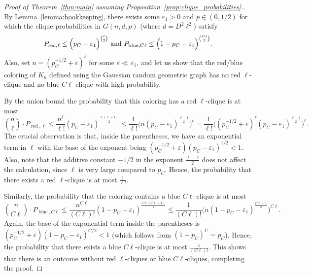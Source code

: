 \documentclass[11pt]{amsart}
\theoremstyle{definition}
\def\eps{\varepsilon}
\DeclareMathOperator{\red}{red}
\DeclareMathOperator{\blue}{blue}
\begin{document}
\begin{proof}[Proof of Theorem~\ref{thm:main} assuming Proposition~\ref{prop:clique_probabilities}.]
By Lemma~\ref{lemma:bookkeeping}, there exists some $\eps_1>0$ and $p\in (0, 1/2)$ for which the clique probabilities in $G(n, d, p)$ (where $d=D^2\ell^2$) satisfy
{\smaller[0.3]
\[P_{{\rm red}, \ell}\leq \Big(p_C-\eps_1\Big)^{\binom{\ell}{2}} \text{ and } P_{{\rm blue}, C\ell}\leq \Big(1-p_C-\eps_1 \Big)^{\binom{C\ell}{2}}.\]
}
Also, set $n=(p_C^{-1/2}+\eps)^\ell$ for some $\eps\ll \eps_1$, and let us show that the red/blue coloring of $K_n$ defined using the Gaussian random geometric graph has no red $\ell$-clique and no blue $C\ell$-clique with high probability.

By the union bound the probability that this coloring has a red $\ell$-clique is at most
{\smaller[0.3]
\[\binom{n}{\ell}\cdot P_{\red, \ell}\leq \frac{n^{\ell}}{\ell!}(p_C-\eps_1)^{\frac{\ell(\ell-1)}{2}}\leq \frac{1}{\ell!}\Big(n(p_C-\eps_1)^{\frac{\ell-1}{2}}\Big)^\ell=\frac{1}{\ell!}\Big((p_C^{-1/2}+\eps)^{\ell}(p_C-\eps_1)^{\frac{\ell-1}{2}}\Big)^\ell.\]
}
The crucial observation is that, inside the parentheses, we have an exponential term in $\ell$ with the base of the exponent being $(p_C^{-1/2}+\eps)(p_C-\eps_1)^{1/2}<1$. Also, note that the additive constant $-1/2$ in the exponent $\frac{\ell-1}{2}$ does not affect the calculation, since $\ell$ is very large compared to $p_C$. Hence, the probability that there exists a red $\ell$-clique is at most $\frac{1}{\ell!}$.

Similarly, the probability that the coloring contains a blue $C\ell$-clique is at most
{\smaller[0.3]
\[\binom{n}{C\ell}\cdot P_{\blue, C\ell}\leq \frac{n^{C\ell}}{(C\ell)!}(1-p_C-\eps_1)^{\frac{C\ell(C\ell-1)}{2}}\leq \frac{1}{(C\ell)!}\Big(n(1-p_C-\eps_1)^{\frac{C\ell-1}{2}}\Big)^{C\ell}.\]
}
Again, the base of the exponential term inside the parentheses is $(p_C^{-1/2}+\eps)(1-p_C-\eps_1)^{C/2}<1$ (which follows from $(1-p_C)^C=p_C$). Hence, the probability that there exists a blue $C\ell$-clique is at most $\frac{1}{(C\ell)!}$. This shows that there is an outcome without red $\ell$-cliques or blue $C\ell$-cliques, completing the proof.
\end{proof}
\end{document}
